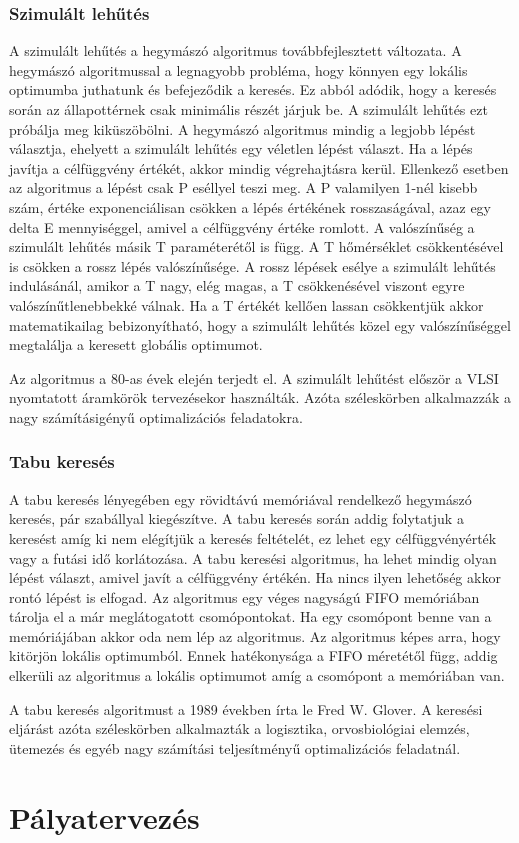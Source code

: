 \subsubsection{Szimulált lehűtés}


A szimulált lehűtés a hegymászó algoritmus továbbfejlesztett változata. A hegymászó algoritmussal a legnagyobb probléma, hogy könnyen egy lokális optimumba juthatunk és befejeződik a keresés. Ez abból adódik, hogy a keresés során az állapottérnek csak minimális részét járjuk be. A szimulált lehűtés ezt próbálja meg kiküszöbölni. A hegymászó algoritmus mindig a legjobb lépést választja, ehelyett a szimulált lehűtés egy véletlen lépést választ. Ha a lépés javítja a célfüggvény értékét, akkor mindig végrehajtásra kerül. Ellenkező esetben az algoritmus a lépést csak P eséllyel teszi meg. A P valamilyen 1-nél kisebb szám, értéke exponenciálisan csökken a lépés értékének rosszaságával, azaz egy delta E mennyiséggel, amivel a célfüggvény értéke romlott. A valószínűség a szimulált lehűtés másik T paraméterétől is függ. A T hőmérséklet csökkentésével is csökken a rossz lépés valószínűsége. A rossz lépések esélye a szimulált lehűtés indulásánál, amikor a T nagy, elég magas, a T csökkenésével viszont egyre valószínűtlenebbekké válnak. Ha a T értékét kellően lassan csökkentjük akkor matematikailag bebizonyítható, hogy a szimulált lehűtés közel egy valószínűséggel megtalálja a keresett globális optimumot.

Az algoritmus a 80-as évek elején terjedt el. A szimulált lehűtést először a VLSI nyomtatott áramkörök tervezésekor használták. Azóta széleskörben alkalmazzák a nagy számításigényű optimalizációs feladatokra.

\subsubsection{Tabu keresés}



A tabu keresés lényegében egy rövidtávú memóriával rendelkező hegymászó keresés, pár szabállyal kiegészítve. A tabu keresés során addig folytatjuk a keresést amíg ki nem elégítjük a keresés feltételét, ez lehet egy célfüggvényérték vagy a futási idő korlátozása. A tabu keresési algoritmus, ha lehet mindig olyan lépést választ, amivel javít a célfüggvény értékén. Ha nincs ilyen lehetőség akkor rontó lépést is elfogad. Az algoritmus egy véges nagyságú FIFO memóriában tárolja el a már meglátogatott csomópontokat. Ha egy csomópont benne van a memóriájában akkor oda nem lép az algoritmus. Az algoritmus képes arra, hogy kitörjön lokális optimumból. Ennek hatékonysága a FIFO méretétől függ, addig elkerüli az algoritmus a lokális optimumot amíg a csomópont a memóriában van.

A tabu keresés algoritmust a 1989 években írta le Fred W. Glover. A keresési eljárást azóta széleskörben alkalmazták a logisztika, orvosbiológiai elemzés, ütemezés és egyéb nagy számítási teljesítményű optimalizációs feladatnál.

\section{Pályatervezés}
